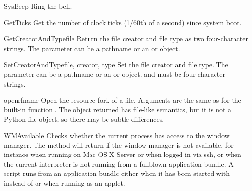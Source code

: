 \begin{funcdesc}{SysBeep}{}
Ring the bell.
\end{funcdesc}

\begin{funcdesc}{GetTicks}{}
Get the number of clock ticks (1/60th of a second) since system boot.
\end{funcdesc}

\begin{funcdesc}{GetCreatorAndType}{file}
Return the file creator and file type as two four-character strings.
The  parameter can be a pathname or an  or 
 object.
\end{funcdesc}

\begin{funcdesc}{SetCreatorAndType}{file, creator, type}
Set the file creator and file type.
The  parameter can be a pathname or an  or 
 object.  and  must be four character
strings.
\end{funcdesc}

\begin{funcdesc}{openrf}{name }
Open the resource fork of a file. Arguments are the same as for the
built-in function . The object returned has file-like
semantics, but it is not a Python file object, so there may be subtle
differences.
\end{funcdesc}

\begin{funcdesc}{WMAvailable}{}
Checks whether the current process has access to the window manager.
The method will return  if the window manager is not available,
for instance when running on Mac OS X Server or when logged in via ssh,
or when the current interpreter is not running from a fullblown application
bundle. A script runs from an application bundle either when it has been
started with  instead of  or when running 
as an applet.
\end{funcdesc}
